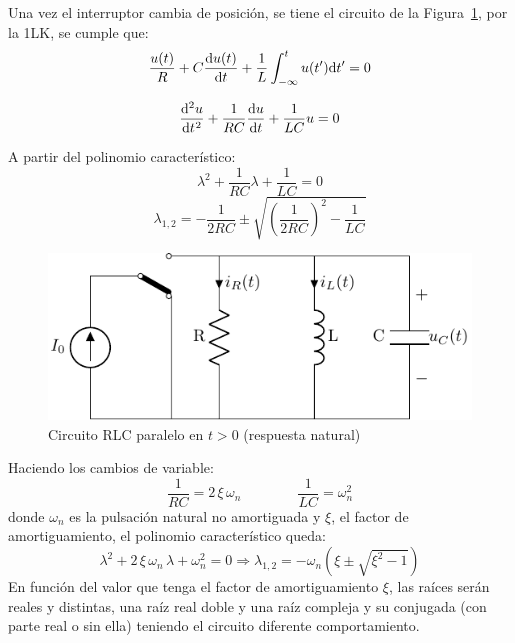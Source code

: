 Una vez el interruptor cambia de posición, se tiene el circuito de la Figura~\ref{fig.transitorio_paralelo_t0+}, por la 1LK, se cumple que:
\[
  \dfrac{u(t)}{R} + C\diff{u(t)}{t} + \frac{1}{L}\int_{-\infty}^t u(t') \mathrm{d}t' = 0
\]

\[
  \diff[2]{u}{t} + \frac{1}{RC} \diff{u}{t} + \frac{1}{LC} u = 0
\]

A partir del polinomio característico: 
\[
\lambda^2 + \frac{1}{RC} \lambda + \frac{1}{LC} = 0  
\]
\[
  \lambda_{1,2} = -\frac{1}{2RC} \pm \sqrt{\left(\frac{1}{2RC}\right)^2 - \frac{1}{LC}}
\]
\begin{figure}[H]
    \centering
    \includegraphics{../figs/transitorio_circuitoRLC_paralelo_t0+.pdf}
    \caption{Circuito RLC paralelo en $t>0$ (respuesta natural)}
    \label{fig.transitorio_paralelo_t0+}
\end{figure}

Haciendo los cambios de variable:
\begin{equation*}
	    {\dfrac{1}{RC}=2\,\xi\,\omega_n}\qquad \qquad {\dfrac{1}{LC}=\omega_n^2}
	\end{equation*}
	donde $\omega_n$ es la pulsación natural no amortiguada y $\xi$, el factor de amortiguamiento, el polinomio característico queda:
	\begin{equation*}
	    \lambda^2+2\,\xi\,\omega_n\,\lambda + \omega_n^2=0 \Rightarrow \lambda_{1,2}=-\omega_n\left(\xi\pm\sqrt{\xi^2-1}\right)
	\end{equation*}
	En función del valor que tenga el factor de amortiguamiento $\xi$, las raíces serán reales y distintas, una raíz real doble y una raíz compleja y su conjugada (con parte real o sin ella) teniendo el circuito diferente comportamiento. 
	
